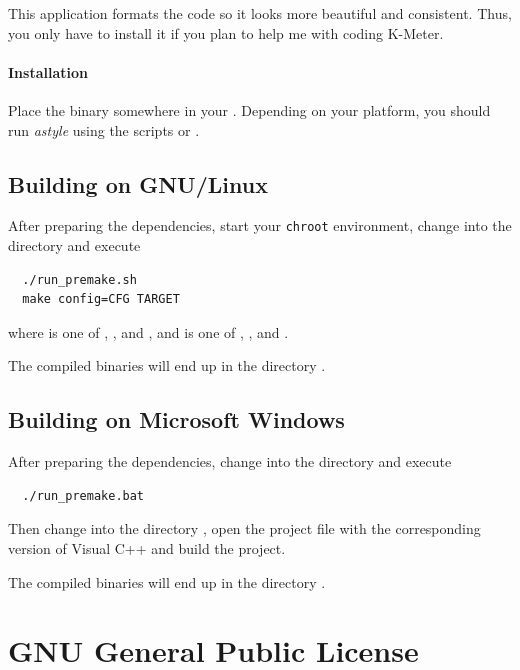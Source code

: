This application formats the code so it looks more beautiful and
consistent.  Thus, you only have to install it if you plan to help me
with coding K-Meter.

\subsubsection{Installation}

Place the binary somewhere in your .  Depending on your
platform, you should run \emph{astyle} using the scripts
 or .

\section{Building on GNU/Linux}

After preparing the dependencies, start your \texttt{chroot}
environment, change into the directory  and execute

\begin{verbatim}
  ./run_premake.sh
  make config=CFG TARGET
\end{verbatim}

where  is one of ,
,  and
, and  is one of
,
,
 and
.

The compiled binaries will end up in the directory .

\section{Building on Microsoft Windows}

After preparing the dependencies, change into the directory
 and execute

\begin{verbatim}
  ./run_premake.bat
\end{verbatim}

Then change into the directory , open the
project file with the corresponding version of Visual C++ and build
the project.

The compiled binaries will end up in the directory .

\chapter{GNU General Public License}

